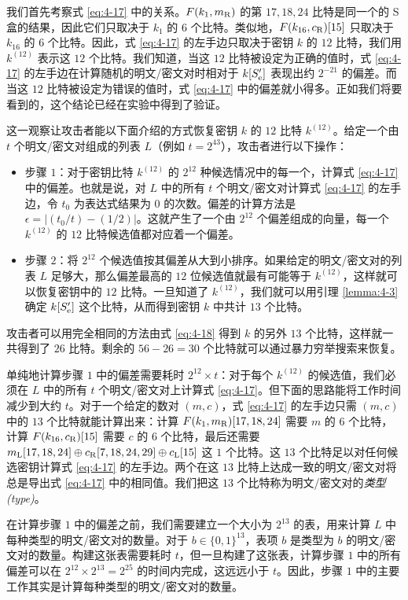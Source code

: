 \begin{snote}
我们首先考察式 \ref{eq:4-17} 中的关系。$F(k_1,m_{\rm R})$ 的第 $17,18,24$ 比特是同一个的 S 盒的结果，因此它们只取决于 $k_1$ 的 $6$ 个比特。类似地，$F(k_{16},c_{\rm R})[15]$ 只取决于 $k_{16}$ 的 $6$ 个比特。因此，式 \ref{eq:4-17} 的左手边只取决于密钥 $k$ 的 $12$ 比特，我们用 $k^{(12)}$ 表示这 $12$ 个比特。我们知道，当这 $12$ 比特被设定为正确的值时，式 \ref{eq:4-17} 的左手边在计算随机的明文/密文对时相对于 $k[S_{\rm e}']$ 表现出约 $2^{-21}$ 的偏差。而当这 $12$ 比特被设定为错误的值时，式 \ref{eq:4-17} 中的偏差就小得多。正如我们将要看到的，这个结论已经在实验中得到了验证。

这一观察让攻击者能以下面介绍的方式恢复密钥 $k$ 的 $12$ 比特 $k^{(12)}$。给定一个由 $t$ 个明文/密文对组成的列表 $L$（例如 $t=2^{43}$），攻击者进行以下操作：
\begin{itemize}
    \item 步骤 $1$：对于密钥比特 $k^{(12)}$ 的 $2^{12}$ 种候选情况中的每一个，计算式 \ref{eq:4-17} 中的偏差。也就是说，对 $L$ 中的所有 $t$ 个明文/密文对计算式 \ref{eq:4-17} 的左手边，令 $t_0$ 为表达式结果为 $0$ 的次数。偏差的计算方法是$\epsilon=|(t_0/t)-(1/2)|$。这就产生了一个由 $2^{12}$ 个偏差组成的向量，每一个 $k^{(12)}$ 的 $12$ 比特候选值都对应着一个偏差。
	\item 步骤 $2$：将 $2^{12}$ 个候选值按其偏差从大到小排序。如果给定的明文/密文对的列表 $L$ 足够大，那么偏差最高的 $12$ 位候选值就最有可能等于 $k^{(12)}$，这样就可以恢复密钥中的 $12$ 比特。一旦知道了 $k^{(12)}$，我们就可以用引理 \ref{lemma:4-3} 确定 $k[S_{\rm e}']$ 这个比特，从而得到密钥 $k$ 中共计 $13$ 个比特。
\end{itemize}
攻击者可以用完全相同的方法由式 \ref{eq:4-18} 得到 $k$ 的另外 $13$ 个比特，这样就一共得到了 $26$ 比特。剩余的 $56-26=30$ 个比特就可以通过暴力穷举搜索来恢复。

单纯地计算步骤 $1$ 中的偏差需要耗时 $2^{12}\times t$：对于每个 $k^{(12)}$ 的候选值，我们必须在 $L$ 中的所有 $t$ 个明文/密文对上计算式 \ref{eq:4-17}。但下面的思路能将工作时间减少到大约 $t$。对于一个给定的数对 $(m,c)$，式 \ref{eq:4-17} 的左手边只需 $(m,c)$ 中的 $13$ 个比特就能计算出来：计算 $F(k_1,m_{\rm R})[17,18,24]$ 需要 $m$ 的 $6$ 个比特，计算 $F(k_{16},c_{\rm R})[15]$ 需要 $c$ 的 $6$ 个比特，最后还需要 $m_{\rm L}[17,18,24]\oplus c_{\rm R}[7,18,24,29]\oplus c_{\rm L}[15]$ 这 $1$ 个比特。这 $13$ 个比特足以对任何候选密钥计算式 \ref{eq:4-17} 的左手边。两个在这 $13$ 比特上达成一致的明文/密文对将总是导出式 \ref{eq:4-17} 中的相同值。我们把这 $13$ 个比特称为明文/密文对的\emph{类型(type)}。

在计算步骤 $1$ 中的偏差之前，我们需要建立一个大小为 $2^{13}$ 的表，用来计算 $L$ 中每种类型的明文/密文对的数量。对于 $b\in\{0,1\}^{13}$，表项 $b$ 是类型为 $b$ 的明文/密文对的数量。构建这张表需要耗时 $t$，但一旦构建了这张表，计算步骤 $1$ 中的所有偏差可以在 $2^{12}\times 2^{13}=2^{25}$ 的时间内完成，这远远小于 $t$。因此，步骤 $1$ 中的主要工作其实是计算每种类型的明文/密文对的数量。


\end{snote}
